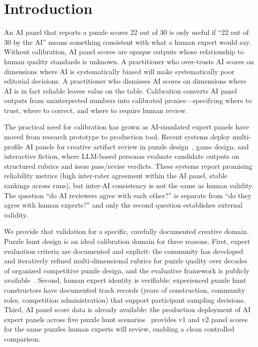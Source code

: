 \section{Introduction}
\label{sec:introduction}

An AI panel that reports a puzzle scores 22 out of 30 is only useful if ``22 out of 30 by the AI'' means something consistent with what a human expert would say. Without calibration, AI panel scores are opaque outputs whose relationship to human quality standards is unknown. A practitioner who over-trusts AI scores on dimensions where AI is systematically biased will make systematically poor editorial decisions. A practitioner who dismisses AI scores on dimensions where AI is in fact reliable leaves value on the table. Calibration converts AI panel outputs from uninterpreted numbers into calibrated proxies---specifying where to trust, where to correct, and where to require human review.

The practical need for calibration has grown as AI-simulated expert panels have moved from research prototype to production tool. Recent systems deploy multi-profile AI panels for creative artifact review in puzzle design~\cite{dellaLibera2025pipeline}, game design, and interactive fiction, where LLM-based personas evaluate candidate outputs on structured rubrics and issue pass/revise verdicts. These systems report promising reliability metrics (high inter-rater agreement within the AI panel, stable rankings across runs), but inter-AI consistency is not the same as human validity. The question ``do AI reviewers agree with each other?'' is separate from ``do they agree with human experts?'' and only the second question establishes external validity.

We provide that validation for a specific, carefully documented creative domain. Puzzle hunt design is an ideal calibration domain for three reasons. First, expert evaluation criteria are documented and explicit: the community has developed and iteratively refined multi-dimensional rubrics for puzzle quality over decades of organized competitive puzzle design, and the evaluative framework is publicly available~\cite{dellaLibera2025taxonomy}. Second, human expert identity is verifiable: experienced puzzle hunt constructors have documented track records (years of construction, community roles, competition administration) that support participant sampling decisions. Third, AI panel score data is already available: the production deployment of AI expert panels across five puzzle hunt scenarios~\cite{dellaLibera2025pipeline} provides v1 and v2 panel scores for the same puzzles human experts will review, enabling a clean controlled comparison.

